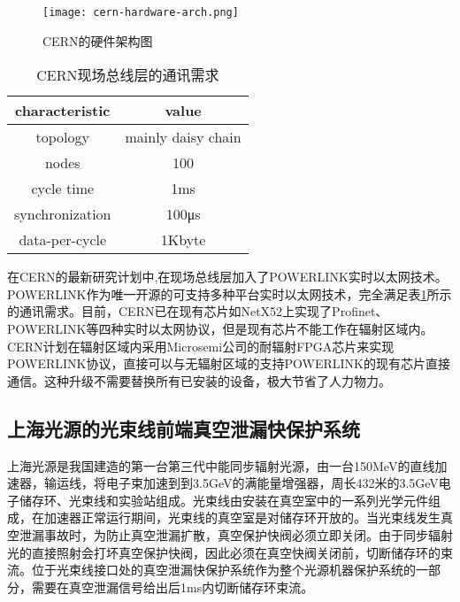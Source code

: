 \begin{figure}[!htb]
	\centering
	\texttt{[image: cern-hardware-arch.png]}
	\caption{CERN的硬件架构图}
	\label{fig:cern-hardware-arch}
\end{figure}

\begin{table}[hbt]
  \centering
  \caption{CERN现场总线层的通讯需求}
  \label{table:1.2}
  \setlength{\tabcolsep}{15mm}
  \begin{tabular}{cc}
    \toprule

    characteristic & value\\
    \midrule
    topology & mainly daisy chain\\
    
    nodes & 100\\
    
    cycle time & 1ms\\
    
    synchronization  & 100μs\\
    
    data-per-cycle & 1Kbyte\\              
    \bottomrule
  \end{tabular}

\end{table}

在CERN的最新研究计划中,在现场总线层加入了POWERLINK实时以太网技术。POWERLINK作为唯一开源的可支持多种平台实时以太网技术，完全满足表\ref{table:1.2}所示的通讯需求。目前，CERN已在现有芯片如NetX52上实现了Profinet、POWERLINK等四种实时以太网协议，但是现有芯片不能工作在辐射区域内。CERN计划在辐射区域内采用Microsemi公司的耐辐射FPGA芯片来实现POWERLINK协议，直接可以与无辐射区域的支持POWERLINK的现有芯片直接通信。这种升级不需要替换所有已安装的设备，极大节省了人力物力。

\subsection{上海光源的光束线前端真空泄漏快保护系统}
上海光源是我国建造的第一台第三代中能同步辐射光源，由一台150MeV的直线加速器，输运线，将电子束加速到到3.5GeV的满能量增强器，周长432米的3.5GeV电子储存环、光束线和实验站组成。光束线由安装在真空室中的一系列光学元件组成，在加速器正常运行期间，光束线的真空室是对储存环开放的。当光束线发生真空泄漏事故时，为防止真空泄漏扩散，真空保护快阀必须立即关闭。由于同步辐射光的直接照射会打坏真空保护快阀，因此必须在真空快阀关闭前，切断储存环的束流。位于光束线接口处的真空泄漏快保护系统作为整个光源机器保护系统的一部分，需要在真空泄漏信号给出后1ms内切断储存环束流。

